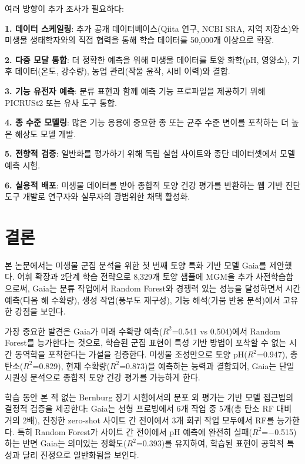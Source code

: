\documentclass[11pt,a4paper]{article}
\begin{document}
여러 방향이 추가 조사가 필요하다:

\textbf{1. 데이터 스케일링}: 추가 공개 데이터베이스(Qiita 연구, NCBI SRA, 지역 저장소)와 미생물 생태학자와의 직접 협력을 통해 학습 데이터를 50,000개 이상으로 확장.

\textbf{2. 다중 모달 통합}: 더 정확한 예측을 위해 미생물 데이터를 토양 화학(pH, 영양소), 기후 데이터(온도, 강수량), 농업 관리(작물 윤작, 시비 이력)와 결합.

\textbf{3. 기능 유전자 예측}: 분류 표현과 함께 예측 기능 프로파일을 제공하기 위해 PICRUSt2 또는 유사 도구 통합.

\textbf{4. 종 수준 모델링}: 많은 기능 응용에 중요한 종 또는 균주 수준 변이를 포착하는 더 높은 해상도 모델 개발.

\textbf{5. 전향적 검증}: 일반화를 평가하기 위해 독립 실험 사이트와 종단 데이터셋에서 모델 예측 시험.

\textbf{6. 실용적 배포}: 미생물 데이터를 받아 종합적 토양 건강 평가를 반환하는 웹 기반 진단 도구 개발로 연구자와 실무자의 광범위한 채택 활성화.

\section{결론}

본 논문에서는 미생물 군집 분석을 위한 첫 번째 토양 특화 기반 모델 Gaia를 제안했다. 어휘 확장과 2단계 학습 전략으로 8,329개 토양 샘플에 MGM을 추가 사전학습함으로써, Gaia는 분류 작업에서 Random Forest와 경쟁력 있는 성능을 달성하면서 시간 예측(다음 해 수확량), 생성 작업(풍부도 재구성), 기능 해석(가뭄 반응 분석)에서 고유한 강점을 보인다.

가장 중요한 발견은 Gaia가 미래 수확량 예측($R^2$=0.541 vs 0.504)에서 Random Forest를 능가한다는 것으로, 학습된 군집 표현이 특성 기반 방법이 포착할 수 없는 시간 동역학을 포착한다는 가설을 검증한다. 미생물 조성만으로 토양 pH($R^2$=0.947), 총 탄소($R^2$=0.829), 현재 수확량($R^2$=0.873)을 예측하는 능력과 결합되어, Gaia는 단일 시퀀싱 분석으로 종합적 토양 건강 평가를 가능하게 한다.

학습 동안 본 적 없는 Bernburg 장기 시험에서의 분포 외 평가는 기반 모델 접근법의 결정적 검증을 제공한다: Gaia는 선형 프로빙에서 6개 작업 중 5개(총 탄소 RF 대비 거의 2배), 진정한 zero-shot 사이트 간 전이에서 3개 회귀 작업 모두에서 RF를 능가한다. 특히 Random Forest가 사이트 간 전이에서 pH 예측에 완전히 실패($R^2$=$-$0.515)하는 반면 Gaia는 의미있는 정확도($R^2$=0.393)를 유지하여, 학습된 표현이 공학적 특성과 달리 진정으로 일반화됨을 보인다.
\end{document}
